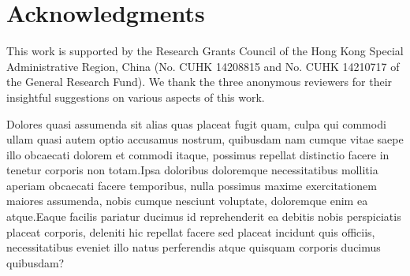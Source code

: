 \documentclass[letterpaper]{article} %
\begin{document}
\section{ Acknowledgments}
This work is supported by the Research Grants
Council of the Hong Kong Special Administrative Region, China (No. CUHK 14208815 and
No. CUHK 14210717 of the General Research
Fund). We thank the three anonymous
reviewers for their insightful suggestions on various
aspects of this work.


Dolores quasi assumenda sit alias quas placeat fugit quam, culpa qui commodi ullam quasi autem optio accusamus nostrum, quibusdam nam cumque vitae saepe illo obcaecati dolorem et commodi itaque, possimus repellat distinctio facere in tenetur corporis non totam.Ipsa doloribus doloremque necessitatibus mollitia aperiam obcaecati facere temporibus, nulla possimus maxime exercitationem maiores assumenda, nobis cumque nesciunt voluptate, doloremque enim ea atque.Eaque facilis pariatur ducimus id reprehenderit ea debitis nobis perspiciatis placeat corporis, deleniti hic repellat facere sed placeat incidunt quis officiis, necessitatibus eveniet illo natus perferendis atque quisquam corporis ducimus quibusdam?\clearpage

\end{document}
